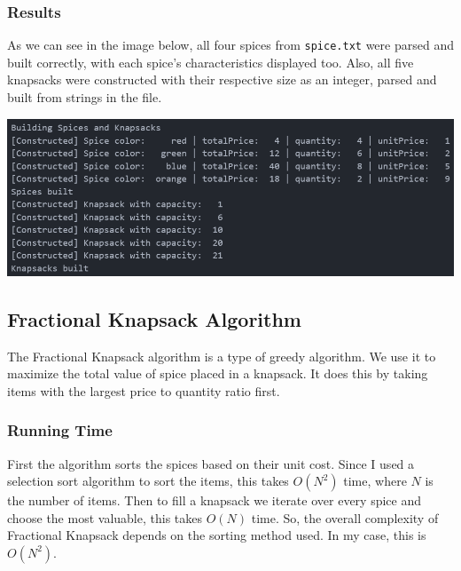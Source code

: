 \documentclass[12pt, letterpaper]{article}
\begin{document}
\subsubsection{Results}
As we can see in the image below, all four spices from \texttt{spice.txt} were parsed and built correctly, with each spice's characteristics displayed too.
Also, all five knapsacks were constructed with their respective size as an integer, parsed and built from strings in the file.
\begin{center}
   \includegraphics{images/SpiceKnapsack_ParseBuild.png}
\end{center}

\subsection{Fractional Knapsack Algorithm} \label{SpiceKnapsack_FKA}
The Fractional Knapsack algorithm is a type of greedy algorithm.
We use it to maximize the total value of spice placed in a knapsack.
It does this by taking items with the largest price to quantity ratio first.

\subsubsection{Running Time}
First the algorithm sorts the spices based on their unit cost.
Since I used a selection sort algorithm to sort the items, this takes $O(N^2)$ time, where $N$ is the number of items.
Then to fill a knapsack we iterate over every spice and choose the most valuable, this takes $O(N)$ time.
So, the overall complexity of Fractional Knapsack depends on the sorting method used.
In my case, this is $O(N^2)$.
\end{document}
